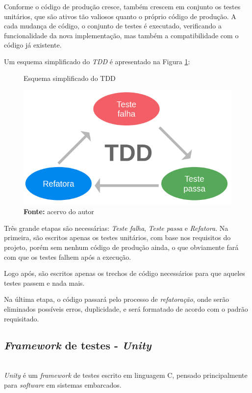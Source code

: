 \documentclass[times, twoside, watermark]{artigo}
\begin{document}
Conforme o código de produção cresce, também crescem em conjunto os testes unitários,
que são ativos tão valiosos quanto o próprio código de produção.
A cada mudança de código, o conjunto de testes é executado, verificando a
funcionalidade da nova implementação, mas também a compatibilidade com o código já
existente\cite{tddembeddedc}.

Um esquema simplificado do \textit{TDD} é apresentado na Figura \ref{fig:tdd}:\hfill\

\begin{figure}[H]
  \centering
  \caption{Esquema simplificado do TDD}
  \includegraphics[width=0.95\linewidth]{images/tdd.png}
  \caption*{\newline\textbf{Fonte:} acervo do autor}
  \label{fig:tdd}
\end{figure}

Três grande etapas são necessárias: \textit{Teste falha}, \textit{Teste passa}
e \textit{Refatora}. Na primeira, são escritos apenas os testes unitários, com base
nos requisitos do projeto, porém sem nenhum código de produção ainda, o que
obviamente fará com que os testes falhem após a execução.

Logo após, são escritos apenas os trechos de código necessários para que aqueles
testes passem e nada mais.

Na última etapa, o código passará pelo processo de \textit{refatoração}, onde serão
eliminados possíveis erros, duplicidade, e será formatado de acordo com o padrão
requisitado.


\subsection{\textit{Framework} de testes - \textit{Unity}}\hfill\\

\textit{Unity} é um \textit{framework} de testes escrito em linguagem C, pensado
principalmente para \textit{software} em sistemas embarcados.
\end{document}

